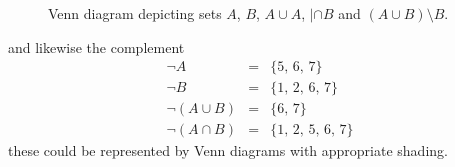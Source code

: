 \documentclass[letterpaper,10pt,english]{jupyterBook}
\begin{document}
\begin{figure}[htbp]
\centering
\capstart

\noindent{}
\caption{Venn diagram depicting sets \(A\), \(B\), \(A \cup A\), \(| \cap B\) and \((A\cup B) \setminus B\).}\label{\detokenize{ProofLogic/setsnotation:venn2}}\end{figure}

\sphinxAtStartPar
and likewise the complement
\begin{equation*}
\begin{split}\neg A &=& \{5,\,6,\,7\} \\
\neg B &=& \{1,\,2,\,6,\,7\} \\
\neg (A \cup B) &=& \{6,\,7\}\\
\neg (A \cap B) &=& \{1,\,2,\,5,\,6,\,7\} \end{split}
\end{equation*}
\sphinxAtStartPar
these could be represented by Venn diagrams with appropriate shading.
\end{document}

